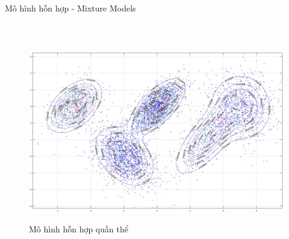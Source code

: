 \begin{frame}{Mô hình hỗn hợp - Mixture Models}
\begin{columns}
\begin{figure}
                \caption{Hỗn hợp phân phối}\\
                \includegraphics[width=1.0\textwidth]{images/mixture-model.png}
            \caption{Mô hình hỗn hợp quần thể}
            \label{fig:mixture-model}
        \end{figure}
		\end{columns}
	\end{frame}
	
